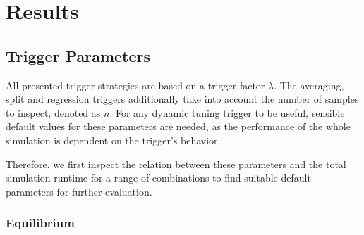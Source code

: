 \chapter[Results]{Results}
\label{cp:results}

{
	\parindent0pt
	\textellipsis
}


\section{Trigger Parameters}
All presented trigger strategies are based on a trigger factor $\lambda$. The averaging, split and regression triggers additionally take into account the number of samples to inspect, denoted as $n$. For any dynamic tuning trigger to be useful, sensible default values for these parameters are needed, as the performance of the whole simulation is dependent on the trigger's behavior.

Therefore, we first inspect the relation between these parameters and the total simulation runtime for a range of combinations to find suitable default parameters for further evaluation.



\subsection{Equilibrium}

